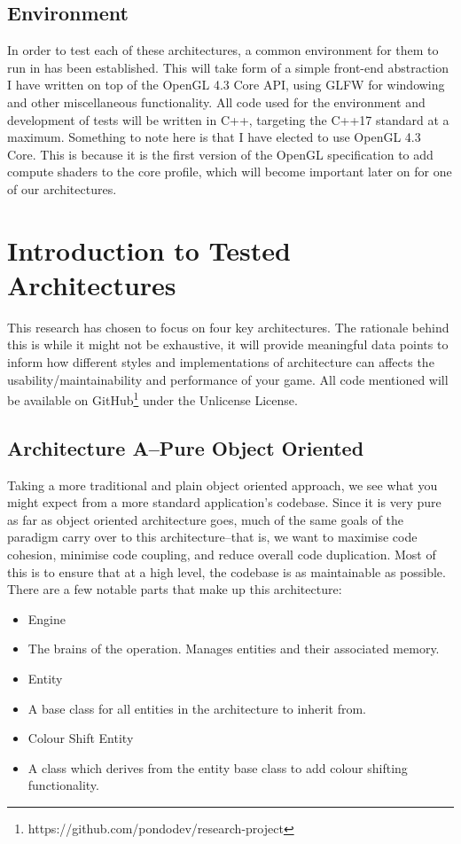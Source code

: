\documentclass{article}
\begin{document}
\subsection{Environment}
In order to test each of these architectures, a common environment for them to
run in has been established. This will take form of a simple front-end
abstraction I have written on top of the OpenGL 4.3 Core API, using GLFW for
windowing and other miscellaneous functionality. All code used for the
environment and development of tests will be written in C++, targeting the C++17
standard at a maximum. Something to note here is that I have elected to use
OpenGL 4.3 Core. This is because it is the first version of the OpenGL
specification to add compute shaders to the core profile, which will become
important later on for one of our architectures.

\section{Introduction to Tested Architectures}
This research has chosen to focus on four key architectures. The rationale
behind this is while it might not be exhaustive, it will provide meaningful
data points to inform how different styles and implementations of architecture
can affects the usability/maintainability and performance of your game. All
code mentioned will be available on
GitHub\footnote{https://github.com/pondodev/research-project} under the
Unlicense License.

\subsection{Architecture A--Pure Object Oriented}
Taking a more traditional and plain object oriented approach, we see what you
might expect from a more standard application's codebase. Since it is very pure
as far as object oriented architecture goes, much of the same goals of the
paradigm carry over to this architecture--that is, we want to maximise code
cohesion, minimise code coupling, and reduce overall code duplication. Most of
this is to ensure that at a high level, the codebase is as maintainable as
possible. There are a few notable parts that make up this architecture:

\begin{itemize}
    \item Engine
    \item[] The brains of the operation. Manages entities and their associated
            memory.

    \item Entity
    \item[] A base class for all entities in the architecture to inherit from.

    \item Colour Shift Entity
    \item[] A class which derives from the entity base class to add colour
            shifting functionality. 
\end{itemize}
\end{document}
